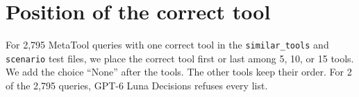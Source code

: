 \section{Position of the correct tool}
\label{app:position}
For 2,795 MetaTool queries with one correct tool in the \texttt{similar\_tools} and \texttt{scenario} test files, we place the correct tool first or last among 5, 10, or 15 tools. We add the choice ``None'' after the tools. The other tools keep their order. For 2 of the 2,795 queries, GPT-6 Luna Decisions refuses every list.

\begin{table}[H]
\caption{Accuracy with the correct tool first and last, and the change in percentage points.}
\label{tab:position}
\centering
\small

\end{table}
